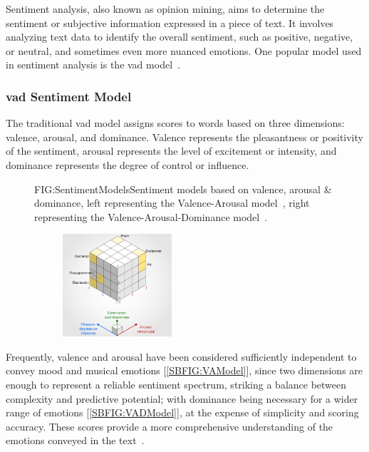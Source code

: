 Sentiment analysis, also known as opinion mining, aims to determine the sentiment or subjective information expressed in a piece of text. It involves analyzing text data to identify the overall sentiment, such as positive, negative, or neutral, and sometimes even more nuanced emotions. One popular model used in sentiment analysis is the \ac{vad} model~\cite{WIKI:EMOTION-CLASSIFICATION}.

\subsubsection{\acs{vad} Sentiment Model}

The traditional \acs{vad} model assigns scores to words based on three dimensions: valence, arousal, and dominance. Valence represents the pleasantness or positivity of the sentiment, arousal represents the level of excitement or intensity, and dominance represents the degree of control or influence.

\begin{figure}[Valence-Arousal-Dominance sentiment models]{FIG:SentimentModels}{Sentiment models based on valence, arousal \& dominance, left representing the Valence-Arousal model~\cite{WIKI:VA-MODEL}, right representing the Valence-Arousal-Dominance model~\cite{WIKI:PAD-MODEL}.}
    \begin{subfigure}[SBFIG:VAModel]{Circumplex Valence-Arousal model}{}
    \end{subfigure}
    \begin{subfigure}[SBFIG:VADModel]{Three-dimensional Valence-Arousal-Dominance model}{\includegraphics[width=0.445\textwidth]{img/VADModel.png}}
    \end{subfigure}
\end{figure}

Frequently, valence and arousal have been considered sufficiently independent to convey mood and musical emotions [\ref{SBFIG:VAModel}], since two dimensions are enough to represent a reliable sentiment spectrum, striking a balance between complexity and predictive potential; with dominance being necessary for a wider range of emotions [\ref{SBFIG:VADModel}], at the expense of simplicity and scoring accuracy. These scores provide a more comprehensive understanding of the emotions conveyed in the text~\cite{EMOTION-MODELS}.

